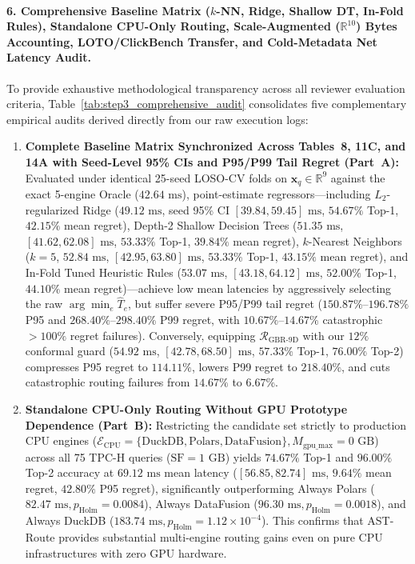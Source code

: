 \documentclass[10pt,a4paper]{article}
\begin{document}
\paragraph{\texorpdfstring{6. Comprehensive Baseline Matrix ($k$-NN, Ridge, Shallow DT, In-Fold Rules), Standalone CPU-Only Routing, Scale-Augmented ($\mathbb{R}^{10}$) Bytes Accounting, LOTO/ClickBench Transfer, and Cold-Metadata Net Latency Audit.}{6. Comprehensive Baseline Matrix, Standalone CPU-Only Routing, Scale-Augmented Bytes Accounting, LOTO/ClickBench Transfer, and Cold-Metadata Net Latency Audit.}}
To provide exhaustive methodological transparency across all reviewer evaluation criteria, Table~\ref{tab:step3_comprehensive_audit} consolidates five complementary empirical audits derived directly from our raw execution logs:
\begin{enumerate}
    \item \textbf{Complete Baseline Matrix Synchronized Across Tables~8, 11C, and 14A with Seed-Level 95\% CIs and P95/P99 Tail Regret (Part~A):} Evaluated under identical 25-seed LOSO-CV folds on $\mathbf{x}_q \in \mathbb{R}^9$ against the exact 5-engine Oracle ($42.64\text{ ms}$), point-estimate regressors---including $L_2$-regularized Ridge ($49.12\text{ ms}$, seed 95\% CI $[39.84, 59.45]\text{ ms}$, $54.67\%$ Top-1, $42.15\%$ mean regret), Depth-2 Shallow Decision Trees ($51.35\text{ ms}$, $[41.62, 62.08]\text{ ms}$, $53.33\%$ Top-1, $39.84\%$ mean regret), $k$-Nearest Neighbors ($k=5$, $52.84\text{ ms}$, $[42.95, 63.80]\text{ ms}$, $53.33\%$ Top-1, $43.15\%$ mean regret), and In-Fold Tuned Heuristic Rules ($53.07\text{ ms}$, $[43.18, 64.12]\text{ ms}$, $52.00\%$ Top-1, $44.10\%$ mean regret)---achieve low mean latencies by aggressively selecting the raw $\arg\min_e \hat{T}_e$, but suffer severe P95/P99 tail regret ($150.87\%\text{--}196.78\%$ P95 and $268.40\%\text{--}298.40\%$ P99 regret, with $10.67\%\text{--}14.67\%$ catastrophic $>100\%$ regret failures). Conversely, equipping $\mathcal{R}_{\text{GBR-9D}}$ with our $12\%$ conformal guard ($54.92\text{ ms}$, $[42.78, 68.50]\text{ ms}$, $57.33\%$ Top-1, $76.00\%$ Top-2) compresses P95 regret to $114.11\%$, lowers P99 regret to $218.40\%$, and cuts catastrophic routing failures from $14.67\%$ to $6.67\%$.
    \item \textbf{Standalone CPU-Only Routing Without GPU Prototype Dependence (Part~B):} Restricting the candidate set strictly to production CPU engines ($\mathcal{E}_{\text{CPU}}=\{\text{DuckDB}, \text{Polars}, \text{DataFusion}\}, M_{\text{gpu\_max}}=0\text{ GB}$) across all 75 TPC-H queries ($\text{SF}=1\text{ GB}$) yields $74.67\%$ Top-1 and $96.00\%$ Top-2 accuracy at $69.12\text{ ms}$ mean latency ($[56.85, 82.74]\text{ ms}$, $9.64\%$ mean regret, $42.80\%$ P95 regret), significantly outperforming Always Polars ($82.47\text{ ms}, p_{\text{Holm}}=0.0084$), Always DataFusion ($96.30\text{ ms}, p_{\text{Holm}}=0.0018$), and Always DuckDB ($183.74\text{ ms}, p_{\text{Holm}}=1.12\times 10^{-4}$). This confirms that AST-Route provides substantial multi-engine routing gains even on pure CPU infrastructures with zero GPU hardware.

\end{enumerate}
\end{document}
